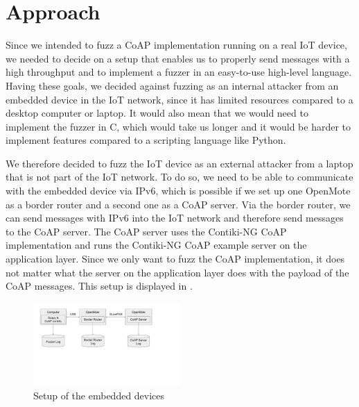 \section{Approach}
\label{section:approach}


Since we intended to fuzz a CoAP implementation running on a real IoT device, we needed to decide on a setup that enables us to properly send messages with a high throughput and to implement a fuzzer in an easy-to-use high-level language. Having these goals, we decided against fuzzing as an internal attacker from an embedded device in the IoT network, since it has limited resources compared to a desktop computer or laptop. It would also mean that we would need to implement the fuzzer in C, which would take us longer and it would be harder to implement features compared to a scripting language like Python.

We therefore decided to fuzz the IoT device as an external attacker from a laptop that is not part of the IoT network. To do so, we need to be able to communicate with the embedded device via IPv6, which is possible if we set up one OpenMote as a border router and a second one as a CoAP server. Via the border router, we can send messages with IPv6 into the IoT network and therefore send messages to the CoAP server. The CoAP server uses the Contiki-NG CoAP implementation and runs the Contiki-NG CoAP example server on the application layer. Since we only want to fuzz the CoAP implementation, it does not matter what the server on the application layer does with the payload of the CoAP messages. This setup is displayed in .

\begin{figure}[h]
	\centering		
	\includegraphics[width=0.5\textwidth]{images/fuzzing_setup}
	\caption{Setup of the embedded devices}
	\label{figure:fuzzing_setup}
\end{figure}

